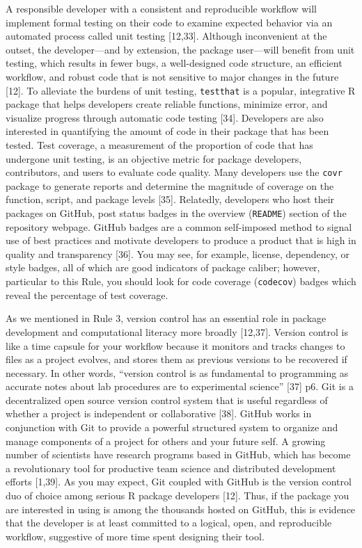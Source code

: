 \documentclass[10pt,letterpaper]{article}
\begin{document}
A responsible developer with a consistent and reproducible workflow will
implement formal testing on their code to examine expected behavior via
an automated process called unit testing {[}12,33{]}. Although
inconvenient at the outset, the developer---and by extension, the
package user---will benefit from unit testing, which results in fewer
bugs, a well-designed code structure, an efficient workflow, and robust
code that is not sensitive to major changes in the future {[}12{]}. To
alleviate the burdens of unit testing, \texttt{testthat} is a popular,
integrative R package that helps developers create reliable functions,
minimize error, and visualize progress through automatic code testing
{[}34{]}. Developers are also interested in quantifying the amount of
code in their package that has been tested. Test coverage, a measurement
of the proportion of code that has undergone unit testing, is an
objective metric for package developers, contributors, and users to
evaluate code quality. Many developers use the \texttt{covr} package to
generate reports and determine the magnitude of coverage on the
function, script, and package levels {[}35{]}. Relatedly, developers who
host their packages on GitHub, post status badges in the overview
(\texttt{README}) section of the repository webpage. GitHub badges are a
common self-imposed method to signal use of best practices and motivate
developers to produce a product that is high in quality and transparency
{[}36{]}. You may see, for example, license, dependency, or style
badges, all of which are good indicators of package caliber; however,
particular to this Rule, you should look for code coverage
(\texttt{codecov}) badges which reveal the percentage of test coverage.

As we mentioned in Rule 3, version control has an essential role in
package development and computational literacy more broadly {[}12,37{]}.
Version control is like a time capsule for your workflow because it
monitors and tracks changes to files as a project evolves, and stores
them as previous versions to be recovered if necessary. In other words,
``version control is as fundamental to programming as accurate notes
about lab procedures are to experimental science'' {[}37{]} p6. Git is a
decentralized open source version control system that is useful
regardless of whether a project is independent or collaborative
{[}38{]}. GitHub works in conjunction with Git to provide a powerful
structured system to organize and manage components of a project for
others and your future self. A growing number of scientists have
research programs based in GitHub, which has become a revolutionary tool
for productive team science and distributed development efforts
{[}1,39{]}. As you may expect, Git coupled with GitHub is the version
control duo of choice among serious R package developers {[}12{]}. Thus,
if the package you are interested in using is among the thousands hosted
on GitHub, this is evidence that the developer is at least committed to
a logical, open, and reproducible workflow, suggestive of more time
spent designing their tool.
\end{document}
